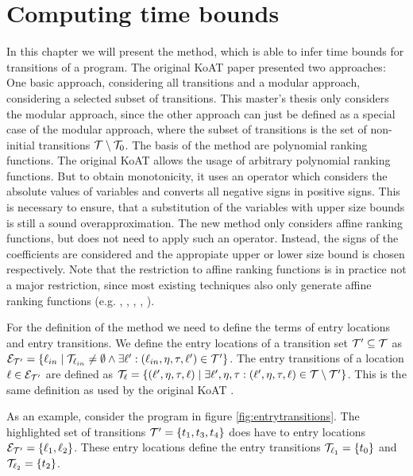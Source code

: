 \section{Computing time bounds}

In this chapter we will present the method, which is able to infer time bounds for transitions of a program.
The original KoAT paper \cite{koat} presented two approaches: One basic approach, considering all transitions and a modular approach, considering a selected subset of transitions.
This master's thesis only considers the modular approach, since the other approach can just be defined as a special case of the modular approach, where the subset of transitions is the set of non-initial transitions $\mathcal{T} \setminus \mathcal{T}_0$.
The basis of the method are polynomial ranking functions.
The original KoAT allows the usage of arbitrary polynomial ranking functions.
But to obtain monotonicity, it uses an operator which considers the absolute values of variables and converts all negative signs in positive signs.
This is necessary to ensure, that a substitution of the variables with upper size bounds is still a sound overapproximation.
The new method only considers affine ranking functions, but does not need to apply such an operator.
Instead, the signs of the coefficients are considered and the appropiate upper or lower size bound is chosen respectively.
Note that the restriction to affine ranking functions is in practice not a major restriction, since most existing techniques also only generate affine ranking functions (e.g. \cite{podelski2004prf}, \cite{bradley2005linear}, \cite{bagnara2012new}, \cite{leike2014ranking}, \cite{ben2013linear}).

For the definition of the method we need to define the terms of entry locations and entry transitions.
We define the entry locations of a transition set $\mathcal{T}' \subseteq \mathcal{T}$ as $\mathcal{E}_{\mathcal{T}'} = \lbrace \ell_{in} \mid \mathcal{T}_{\ell_{in}} \neq \emptyset \wedge \exists \ell': (\ell_{in}, \eta, \tau, \ell') \in \mathcal{T}' \rbrace$.
The entry transitions of a location $\ell \in \mathcal{E}_{\mathcal{T}'}$ are defined as $\mathcal{T}_{\ell} = \lbrace (\ell', \eta, \tau, \ell) \mid \exists \ell', \eta, \tau: (\ell', \eta, \tau, \ell) \in \mathcal{T} \setminus \mathcal{T}' \rbrace$.
This is the same definition as used by the original KoAT \cite{koat}.

As an example, consider the program in figure \ref{fig:entrytransitions}.
The highlighted set of transitions $\mathcal{T}' = \lbrace t_1, t_3, t_4 \rbrace$ does have to entry locations $\mathcal{E}_{\mathcal{T}'} = \lbrace \ell_1, \ell_2 \rbrace$.
These entry locations define the entry transitions $\mathcal{T}_{\ell_1} = \lbrace t_0 \rbrace$ and $\mathcal{T}_{\ell_2} = \lbrace t_2 \rbrace$.

